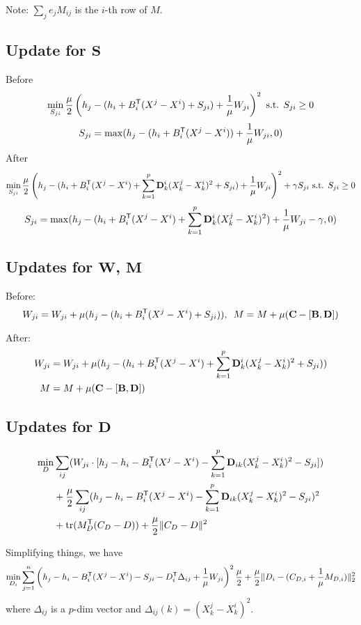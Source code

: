 \documentclass{article}
\begin{document}
Note: $\sum_{j} e_j M_{ij}$ is the $i$-th row of $M$. 

\subsection{Update for $\mathbf{S}$}

Before
\[
\min_{S_{ji}} \frac{\mu}{2} \left(h_j - (h_i + B_i^{\mathsf{T}} (X^j - X^i)  + S_{ji} ) + \frac{1}{\mu}W_{ji}\right)^2  \textrm{ s.t. } S_{ji} \geq 0
\]
\[
S_{ji} = \max(h_j - (h_i + B_i^{\mathsf{T}} (X^j - X^i)) + \frac{1}{\mu} W_{ji}, 0)
\]
After
\[
\min_{S_{ji}} \frac{\mu}{2} \left(h_j - (h_i + B_i^{\mathsf{T}} (X^j - X^i) + \sum_{k=1}^p \mathbf{D}^i_k (X^j_k - X^i_k)^2 + S_{ji} ) + \frac{1}{\mu}W_{ji}\right)^2 + \gamma S_{ji} \textrm{ s.t. } S_{ji} \geq 0
\]
\[
S_{ji} = \max(h_j - (h_i + B_i^{\mathsf{T}} (X^j - X^i) + \sum_{k=1}^p \mathbf{D}^i_k (X^j_k - X^i_k)^2 ) + \frac{1}{\mu} W_{ji} - \gamma, 0)
\]

\subsection{Updates for $\mathbf{W}$, $\mathbf{M}$}

Before:
\[
W_{ji} = W_{ji} + \mu ( h_j - (h_i + B_i^{\mathsf{T}} (X^j - X^i) + S_{ji})),  \,\,\, M = M + \mu ( \mathbf{C} - [\mathbf{B},\mathbf{D}])
\]

After:
\begin{align*}
W_{ji} &= W_{ji} + \mu ( h_j - (h_i + B_i^{\mathsf{T}} (X^j - X^i) + \sum_{k=1}^p \mathbf{D}^i_k (X^j_k - X^i_k)^2 + S_{ji})) \\
M &= M + \mu ( \mathbf{C} - [\mathbf{B},\mathbf{D}])
\end{align*}

\subsection{Updates for $\mathbf{D}$}

\begin{align*}
\min_D & \sum_{ij} (W_{ji} \cdot [ h_j - h_i - B_i^{\mathsf{T}}(X^j - X^i) - \sum_{k=1}^p \mathbf{D}_{ik} (X^j_k - X^i_k)^2 - S_{ji}]) \\
& + \frac{\mu}{2} \sum_{ij} ( h_j - h_i - B_i^{\mathsf{T}} (X^j - X^i) -\sum_{k=1}^p \mathbf{D}_{ik} (X^j_k - X^i_k)^2-S_{ji})^2 \\
& + \mathrm{tr}(M_D^{\mathsf{T}} (C_D - D)) + \frac{\mu}{2} \| C_D - D\|^2
\end{align*}

Simplifying things, we have 
\[
\min_{D_i} \sum_{j=1}^n \left( h_j - h_i - B_i^{\mathsf{T}} (X^j - X^i) - S_{ji} - D_i^{\mathsf{T}} \Delta_{ij} + \frac{1}{\mu} W_{ji} \right)^2 \frac{\mu}{2} + \frac{\mu}{2} \| D_i - (C_{D,i} + \frac{1}{\mu} M_{D,i}) \|_2^2
\]
where $\Delta_{ij}$ is a $p$-dim vector and $\Delta_{ij}(k) = (X^j_k - X^i_k)^2$.
\end{document}
